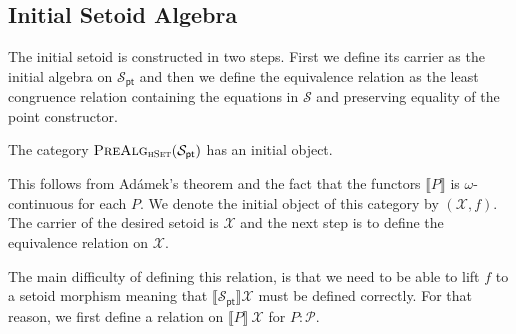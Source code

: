 \documentclass[9pt]{entcs}
\newcommand{\type}[1]{\textsc{#1}}
\newcommand{\category}[1]{\textsc{#1}}
\newcommand{\hset}{\type{hSet}} %
\newcommand{\0}{\textbf{0}} %
\newcommand{\poly}{\mathcal{P}} %
\newcommand{\pt}[0]{\textsf{pt}}
\newcommand{\pointc}[1]{#1_{\pt}} %
\newcommand{\sig}{\mathcal{S}} %
\newcommand{\semP}[1]{\llbracket #1 \rrbracket} %
\newcommand{\prealg}[1]{\category{PreAlg}_{\hset}(#1)} %
\newcommand{\CRC}{\mathcal{X}} %
\begin{document}
\subsection{Initial Setoid Algebra}
The initial setoid is constructed in two steps.
First we define its carrier as the initial algebra on $\pointc{\sig}$ and then we define the equivalence relation as the least congruence relation containing the equations in $\sig$ and preserving equality of the point constructor.

\begin{lemma}
The category $\prealg{\pointc{\sig}}$ has an initial object.
\end{lemma}

This follows from Ad\'amek's theorem and the fact that the functors $\semP{P}$ is $\omega$-continuous for each $P$.
We denote the initial object of this category by $(\CRC , f)$.
The carrier of the desired setoid is $\CRC$ and the next step is to define the equivalence relation on $\CRC$.

The main difficulty of defining this relation, is that we need to be able to lift $f$ to a setoid morphism meaning that $\semP{\pointc{\sig}}{\CRC}$ must be defined correctly.
For that reason, we first define a relation on $\semP{P} \> \CRC$ for $P : \poly$.
\end{document}
